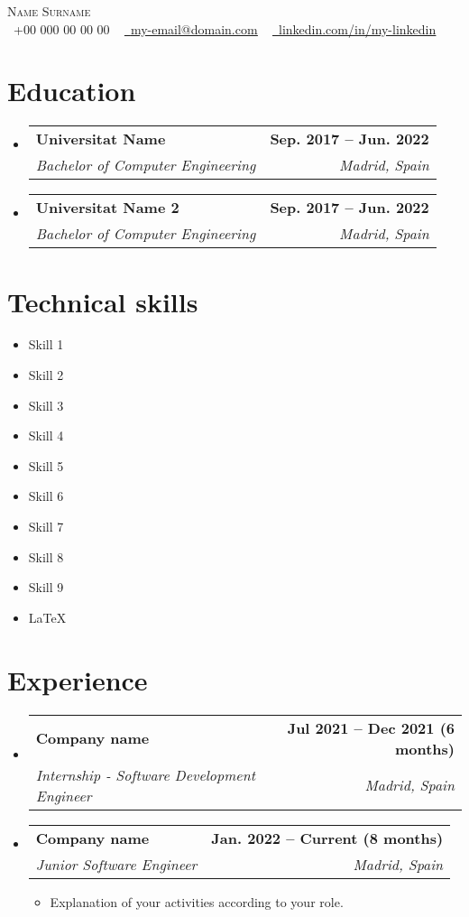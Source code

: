 \documentclass[letterpaper,11pt]{article}
\makeatletter
\newcommand{\resumeItem}[1]{
	\item\small{
		{#1 \vspace{-2pt}}
	}
}
\newcommand{\resumeSubheading}[4]{
	\vspace{-2pt}\item
	\begin{tabular*}{1.0\textwidth}[t]{l@{\extracolsep{\fill}}r}
		\textbf{#1} & \textbf{\small #2} \\
		\textit{\small#3} & \textit{\small #4} \\
	\end{tabular*}\vspace{-7pt}
}
\newcommand{\resumeSubHeadingListStart}{\begin{itemize}[leftmargin=0.0in, label={}]}
\newcommand{\resumeSubHeadingListEnd}{\end{itemize}}
\newcommand{\resumeItemListStart}{\begin{itemize}}
\newcommand{\resumeItemListEnd}{\end{itemize}\vspace{-20pt}}
\makeatother
\begin{document}
	\begin{center}
		{\Huge \scshape {\color{colorNombre}Name} Surname} \\ \vspace{1pt}
		\vspace{0.4cm}
		\small \raisebox{-0.1\height}{\color{colorSimbolos}{\faPhone}}\ +00 000 00 00 00 ~ \href{mailto:email@mail.com}{\raisebox{-0.2\height}{\color{colorSimbolos}{\faEnvelope}}\  \ul{my-email@domain.com}} ~ 
		\href{https://linkedin.com/in//}{\raisebox{-0.2\height}{\color{colorSimbolos}{\faLinkedin}}\ \ul{linkedin.com/in/my-linkedin}}  ~
		\vspace{0.2cm}
	\end{center}

	\section{Education}
	\resumeSubHeadingListStart
		\resumeSubheading
			{Universitat Name}{Sep. 2017 -- Jun. 2022}
			{Bachelor of Computer Engineering}{Madrid, Spain}
		\resumeSubheading
			{Universitat Name 2}{Sep. 2017 -- Jun. 2022}
			{Bachelor of Computer Engineering}{Madrid, Spain}
	\resumeSubHeadingListEnd
	
	\section{Technical skills}
	\begin{multicols}{2}
	\begin{itemize}[itemsep=1pt, parsep=3pt]
		\item Skill 1
		\item Skill 2
		\item Skill 3
		\item Skill 4
		\item Skill 5
		\item Skill 6
		\item Skill 7
		\item Skill 8
		\item Skill 9
		\item \LaTeX
	\end{itemize}
	\end{multicols}
	
	\section{Experience}
		\resumeSubHeadingListStart
			\resumeSubheading
				{Company name}{Jul 2021 -- Dec 2021 (6 months)}
				{Internship - Software Development Engineer}{Madrid, Spain}
			\resumeSubheading
				{Company name}{Jan. 2022 -- Current (8 months)}
				{Junior Software Engineer}{Madrid, Spain}
			\resumeItemListStart
				\resumeItem{Explanation of your activities according to your role. }
			\resumeItemListEnd
		\resumeSubHeadingListEnd
\end{document}
